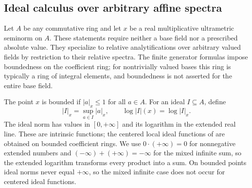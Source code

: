 \subsection{Ideal calculus over arbitrary affine spectra}
\label{subsec:general-ideal-functions}

Let $A$ be any commutative ring and let $x$ be a real multiplicative
ultrametric seminorm on $A$. These statements require neither a base field
nor a prescribed absolute value. They specialize to relative analytifications
over arbitrary valued fields by restriction to their relative spectra. The
finite generator formulas impose boundedness on the coefficient ring; for
nontrivially valued bases this ring is typically a ring of integral elements,
and boundedness is not asserted for the entire base field.

\begin{definition}
\label{def:general-ideal-norm}
\leanok
{}
The point $x$ is bounded if $|a|_x\le1$ for all $a\in A$. For an ideal
$I\subseteq A$, define
\[
 |I|_x=\sup_{a\in I}|a|_x,\qquad \log|I|(x)=\log|I|_x.
\]
The ideal norm has values in $[0,+\infty]$ and its logarithm in the
extended real line. These are intrinsic functions; the centered local ideal
functions of \cite[\S2.1]{FHX} are obtained on bounded coefficient rings.
We use $0\cdot(+\infty)=0$ for nonnegative extended numbers and
$(-\infty)+(+\infty)=-\infty$ for the mixed infinite sum, so the
extended logarithm transforms every product into a sum. On bounded
points ideal norms never equal $+\infty$, so the mixed infinite case
does not occur for centered ideal functions.
\end{definition}

